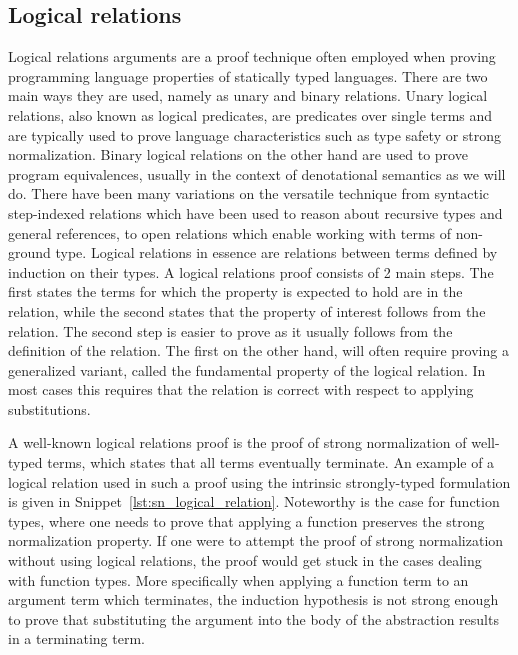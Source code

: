 \subsection{Logical relations}
Logical relations arguments are a proof technique often employed when proving programming language properties of statically typed languages\cite{skorstengaard2019introduction}. There are two main ways they are used, namely as unary and binary relations.
Unary logical relations, also known as logical predicates, are predicates over single terms and are typically used to prove language characteristics such as type safety or strong normalization.
Binary logical relations on the other hand are used to prove program equivalences, usually in the context of denotational semantics as we will do.
There have been many variations on the versatile technique from syntactic step-indexed relations which have been used to reason about recursive types and general references\cite{Ahmed2006}, to open relations which enable working with terms of non-ground type\cite{barthe2020versatility}\cite{huot2020correctness}.
Logical relations in essence are relations between terms defined by induction on their types.
A logical relations proof consists of 2 main steps.
The first states the terms for which the property is expected to hold are in the relation, while the second states that the property of interest follows from the relation.
The second step is easier to prove as it usually follows from the definition of the relation. The first on the other hand, will often require proving a generalized variant, called the fundamental property of the logical relation.
In most cases this requires that the relation is correct with respect to applying substitutions.

A well-known logical relations proof is the proof of strong normalization of well-typed terms, which states that all terms eventually terminate.
An example of a logical relation used in such a proof using the intrinsic strongly-typed formulation is given in Snippet~\ref{lst:sn_logical_relation}.
Noteworthy is the case for function types, where one needs to prove that applying a function preserves the strong normalization property.
If one were to attempt the proof of strong normalization without using logical relations, the proof would get stuck in the cases dealing with function types.
More specifically when applying a function term to an argument term which terminates, the induction hypothesis is not strong enough to prove that substituting the argument into the body of the abstraction results in a terminating term.

